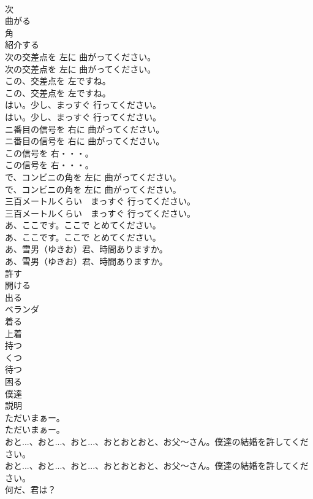 \documentclass[8pt]{extreport}
\begin{document}
\begin{CJK}{UTF8}{min}
\\	次
\\	曲がる
\\	角
\\	紹介する
\\	次の交差点を 左に 曲がってください。	
\\	次の交差点を 左に 曲がってください。 
\\	この、交差点を 左ですね。	
\\	この、交差点を 左ですね。 
\\	はい。少し、まっすぐ 行ってください。	
\\	はい。少し、まっすぐ 行ってください。 
\\	ニ番目の信号を 右に 曲がってください。	
\\	ニ番目の信号を 右に 曲がってください。 
\\	この信号を 右・・・。	
\\	この信号を 右・・・。 
\\	で、コンビニの角を 左に 曲がってください。	
\\	で、コンビニの角を 左に 曲がってください。 
\\	三百メートルくらい　まっすぐ 行ってください。	
\\	三百メートルくらい　まっすぐ 行ってください。 
\\	あ、ここです。ここで とめてください。	
\\	あ、ここです。ここで とめてください。 
\\	あ、雪男（ゆきお）君、時間ありますか。	
\\	あ、雪男（ゆきお）君、時間ありますか。 
\\	許す
\\	開ける
\\	出る
\\	ベランダ
\\	着る
\\	上着
\\	持つ
\\	くつ
\\	待つ
\\	困る
\\	僕達
\\	説明
\\	ただいまぁー。	
\\	ただいまぁー。 
\\	おと...、おと...、おと...、おとおとおと、お父～さん。僕達の結婚を許してください。	
\\	おと...、おと...、おと...、おとおとおと、お父～さん。僕達の結婚を許してください。 
\\	何だ、君は？	

\end{CJK}
\end{document}
